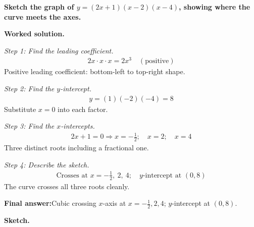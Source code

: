 \documentclass[11pt]{article}
\newcommand{\question}[1]{\par\medskip\noindent\textbf{#1}\par}
\begin{document}
\question{Sketch the graph of \( y = (2x + 1)(x - 2)(x - 4) \), showing where the curve meets the axes.}

\textbf{Worked solution.}

\textit{Step 1: Find the leading coefficient.}
\[\begin{gathered}
2x \cdot x \cdot x = 2x^3 \quad (\text{positive})
\end{gathered}\]
Positive leading coefficient: bottom-left to top-right shape.

\textit{Step 2: Find the \( y \)-intercept.}
\[\begin{gathered}
y = (1)(-2)(-4) = 8
\end{gathered}\]
Substitute \( x = 0 \) into each factor.

\textit{Step 3: Find the \( x \)-intercepts.}
\[\begin{gathered}
2x + 1 = 0 \Rightarrow x = -\tfrac{1}{2}; \quad x = 2; \quad x = 4
\end{gathered}\]
Three distinct roots including a fractional one.

\textit{Step 4: Describe the sketch.}
\[\begin{gathered}
\text{Crosses at } x = -\tfrac{1}{2},\ 2,\ 4; \quad y\text{-intercept at } (0, 8)
\end{gathered}\]
The curve crosses all three roots cleanly.

\begin{answerbox}
\textbf{Final answer:}\quad Cubic crossing \(\displaystyle x\)-axis at \(\displaystyle x = -\tfrac{1}{2}, 2, 4\); \(\displaystyle y\)-intercept at \(\displaystyle (0, 8)\).
\end{answerbox}
\textbf{Sketch.}
\end{document}
